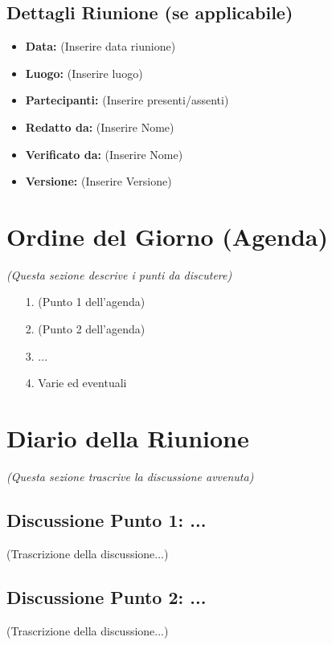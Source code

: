 \documentclass[a4paper, 11pt, oneside]{scrartcl} %
\begin{document}
\subsection{Dettagli Riunione (se applicabile)}
\begin{itemize}
    \item \textbf{Data:} (Inserire data riunione)
    \item \textbf{Luogo:} (Inserire luogo)
    \item \textbf{Partecipanti:} (Inserire presenti/assenti)
    \item  \textbf{Redatto da: } (Inserire Nome)
    \item  \textbf{Verificato da:} (Inserire Nome)
    \item \textbf{Versione: } (Inserire Versione)
\end{itemize}


\newpage
\section{Ordine del Giorno (Agenda)}
\emph{(Questa sezione descrive i punti da discutere)}

\begin{itemize}
    \item[1.] (Punto 1 dell'agenda)
    \item[2.] (Punto 2 dell'agenda)
    \item[3.] ...
    \item[4.] Varie ed eventuali
\end{itemize}

\newpage
\section{Diario della Riunione}
\emph{(Questa sezione trascrive la discussione avvenuta)}

\subsection{Discussione Punto 1: ...}
(Trascrizione della discussione...)

\subsection{Discussione Punto 2: ...}
(Trascrizione della discussione...)
\end{document}
